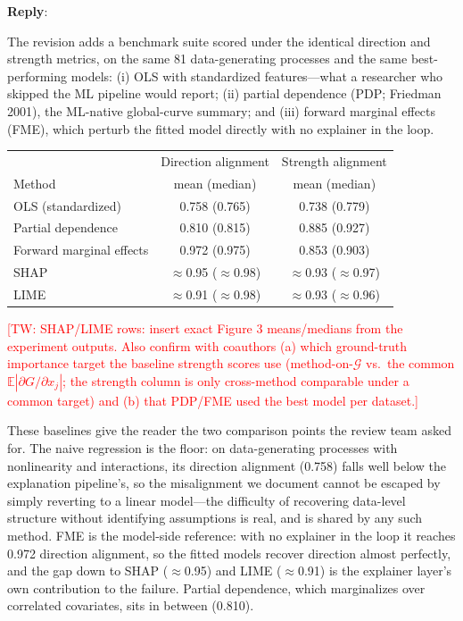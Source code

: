 \documentclass[11pt]{article}
\newcommand{\tw}[1]{\textcolor{red}{[TW: #1]}}
\newcounter{se}[section]
\newcounter{reviewer}
\newcounter{point}[reviewer]
\newenvironment{reply}
 {\par\medskip \noindent \begin{sf}\textbf{Reply}:\ }
 {\medskip \end{sf}}
\begin{document}
\begin{reply}
{\color{red}
The revision adds a benchmark suite scored under the identical direction and strength metrics, on the same 81 data-generating processes and the same best-performing models: (i) OLS with standardized features---what a researcher who skipped the ML pipeline would report; (ii) partial dependence (PDP; Friedman 2001), the ML-native global-curve summary; and (iii) forward marginal effects (FME), which perturb the fitted model directly with no explainer in the loop.

\begin{center}
\begin{tabular}{lcc}
\toprule
 & Direction alignment & Strength alignment \\
Method & mean (median) & mean (median) \\
\midrule
OLS (standardized) & 0.758 (0.765) & 0.738 (0.779) \\
Partial dependence & 0.810 (0.815) & 0.885 (0.927) \\
Forward marginal effects & 0.972 (0.975) & 0.853 (0.903) \\
SHAP & $\approx$0.95 ($\approx$0.98) & $\approx$0.93 ($\approx$0.97) \\
LIME & $\approx$0.91 ($\approx$0.98) & $\approx$0.93 ($\approx$0.96) \\
\bottomrule
\end{tabular}
\end{center}
\tw{SHAP/LIME rows: insert exact Figure 3 means/medians from the experiment outputs. Also confirm with coauthors (a) which ground-truth importance target the baseline strength scores use (method-on-$\mathcal{G}$ vs.\ the common $\mathbb{E}|\partial G/\partial x_j|$; the strength column is only cross-method comparable under a common target) and (b) that PDP/FME used the best model per dataset.}

These baselines give the reader the two comparison points the review team asked for. The naive regression is the floor: on data-generating processes with nonlinearity and interactions, its direction alignment (0.758) falls well below the explanation pipeline's, so the misalignment we document cannot be escaped by simply reverting to a linear model---the difficulty of recovering data-level structure without identifying assumptions is real, and is shared by any such method. FME is the model-side reference: with no explainer in the loop it reaches 0.972 direction alignment, so the fitted models recover direction almost perfectly, and the gap down to SHAP ($\approx$0.95) and LIME ($\approx$0.91) is the explainer layer's own contribution to the failure. Partial dependence, which marginalizes over correlated covariates, sits in between (0.810).

}
\end{reply}
\end{document}
